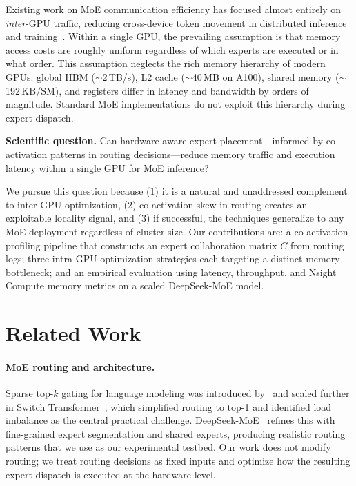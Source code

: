 \documentclass{article}
\begin{document}
Existing work on MoE communication efficiency has focused almost entirely on
\emph{inter}-GPU traffic, reducing cross-device token movement in distributed
inference and training~\citep{luo2025occult,jiang2024megascale}.
Within a single GPU, the prevailing assumption is that memory access costs are roughly
uniform regardless of which experts are executed or in what order.
This assumption neglects the rich memory hierarchy of modern GPUs: global HBM
($\sim$2\,TB/s), L2 cache ($\sim$40\,MB on A100), shared memory
($\sim$192\,KB/SM), and registers differ in latency and bandwidth by orders of
magnitude.
Standard MoE implementations do not exploit this hierarchy during expert dispatch.
 
\textbf{Scientific question.}
Can hardware-aware expert placement—informed by co-activation patterns in routing
decisions—reduce memory traffic and execution latency within a single GPU for MoE
inference?
 
We pursue this question because (1) it is a natural and unaddressed complement to
inter-GPU optimization, (2) co-activation skew in routing creates an exploitable
locality signal, and (3) if successful, the techniques generalize to any MoE
deployment regardless of cluster size.
Our contributions are: a co-activation profiling pipeline that constructs an expert
collaboration matrix $C$ from routing logs; three intra-GPU optimization strategies
each targeting a distinct memory bottleneck; and an empirical evaluation using
latency, throughput, and Nsight Compute memory metrics on a scaled DeepSeek-MoE
model.
 
\section{Related Work}
 
\paragraph{MoE routing and architecture.}
Sparse top-$k$ gating for language modeling was introduced by~\citet{shazeer2017outrageously}
and scaled further in Switch Transformer~\citep{fedus2022switch}, which simplified
routing to top-1 and identified load imbalance as the central practical challenge.
DeepSeek-MoE~\citep{deepseek2024} refines this with fine-grained expert segmentation
and shared experts, producing realistic routing patterns that we use as our experimental
testbed.
Our work does not modify routing; we treat routing decisions as fixed inputs and
optimize how the resulting expert dispatch is executed at the hardware level.
 
\end{document}
